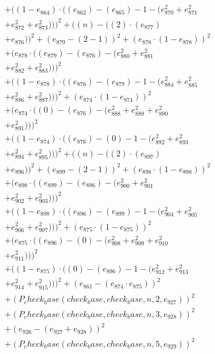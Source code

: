 \documentclass[10pt, a4paper]{article}
\begin{document}
\begin{align*}
& + ((1 - e_{864})  \cdot  ((e_{862}) - (e_{865}) - 1 - (e_{870}^{2} + e_{871}^{2} \\
& + e_{872}^{2} + e_{873}^{2})))^{2} + ((n) - ((2)  \cdot  (e_{877}) \\
& + e_{876}))^{2} + (e_{879} - (2 - 1))^{2} + (e_{878}  \cdot  (1 - e_{878}))^{2} \\
& + (e_{878}  \cdot  ((e_{879}) - (e_{876}) - (e_{880}^{2} + e_{881}^{2} \\
& + e_{882}^{2} + e_{883}^{2})))^{2} \\
& + ((1 - e_{878})  \cdot  ((e_{876}) - (e_{879}) - 1 - (e_{884}^{2} + e_{885}^{2} \\
& + e_{886}^{2} + e_{887}^{2})))^{2} + (e_{874}  \cdot  (1 - e_{874}))^{2} \\
& + (e_{874}  \cdot  ((0) - (e_{876}) - (e_{888}^{2} + e_{889}^{2} + e_{890}^{2} \\
& + e_{891}^{2})))^{2} \\
& + ((1 - e_{874})  \cdot  ((e_{876}) - (0) - 1 - (e_{892}^{2} + e_{893}^{2} \\
& + e_{894}^{2} + e_{895}^{2})))^{2} + ((n) - ((2)  \cdot  (e_{897}) \\
& + e_{896}))^{2} + (e_{899} - (2 - 1))^{2} + (e_{898}  \cdot  (1 - e_{898}))^{2} \\
& + (e_{898}  \cdot  ((e_{899}) - (e_{896}) - (e_{900}^{2} + e_{901}^{2} \\
& + e_{902}^{2} + e_{903}^{2})))^{2} \\
& + ((1 - e_{898})  \cdot  ((e_{896}) - (e_{899}) - 1 - (e_{904}^{2} + e_{905}^{2} \\
& + e_{906}^{2} + e_{907}^{2})))^{2} + (e_{875}  \cdot  (1 - e_{875}))^{2} \\
& + (e_{875}  \cdot  ((e_{896}) - (0) - (e_{908}^{2} + e_{909}^{2} + e_{910}^{2} \\
& + e_{911}^{2})))^{2} \\
& + ((1 - e_{875})  \cdot  ((0) - (e_{896}) - 1 - (e_{912}^{2} + e_{913}^{2} \\
& + e_{914}^{2} + e_{915}^{2})))^{2} + (e_{861} - (e_{874}  \cdot  e_{875}))^{2} \\
& + (P_check_base(check_base, check_base, n, 2, e_{927}))^{2} \\
& + (P_check_base(check_base, check_base, n, 3, e_{928}))^{2} \\
& + (e_{926} - (e_{927} + e_{928}))^{2} \\
& + (P_check_base(check_base, check_base, n, 5, e_{929}))^{2} \\

\end{align*}
\end{document}
